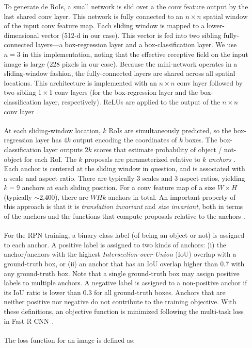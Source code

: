 \documentclass[a4paper]{article}
\begin{document}
To generate de RoIs, a small network is slid over a the conv feature output by the last shared conv layer. This network is fully connected to an $n \times n$ spatial window of the input conv feature map. Each sliding window is mapped to a lower-dimensional vector (512-d in our case). This vector is fed into two sibling fully-connected layers---a box-regression layer and a box-classification layer. We use $n = 3$ in this implementation, noting that the effective receptive field on the input image is large (228 pixels in our case). Because the mini-network operates in a sliding-window fashion, the fully-connected layers are shared across all spatial locations. This architecture is implemented with an $n \times n$ conv layer followed by two sibling $1 \times 1$ conv layers (for the box-regression layer and the box-classification layer, respectively). ReLUs are applied to the output of the $n \times n$ conv layer \cite{fasterrcnn}.
\\
\\
At each sliding-window location, $k$ RoIs are simultaneously predicted, so the box-regression layer has $4k$ output encoding the coordinates of $k$ boxes. The box-classification layer outputs $2k$ scores that estimate probability of object / not-object for each RoI. The $k$ proposals are parameterized relative to $k$ \emph{anchors} \cite{fasterrcnn}. Each anchor is centered at the sliding window in question, and is associated with a scale and aspect ratio. There are typically 3 scales and 3 aspect ratios, yielding $k = 9$ anchors at each sliding position. For a conv feature map of a size $W \times H$ (typically $\sim$2,400), there are $WHk$ anchors in total. An important property of this approach is that it is \emph{translation invariant} and \emph{size invariant}, both in terms of the anchors and the functions that compute proposals relative to the anchors \cite{fasterrcnn}.
\\
\\
For the RPN training, a binary class label (of being an object or not) is assigned to each anchor. A positive label is assigned to two kinds of anchors: (i) the anchor/anchors with the highest \emph{Intersection-over-Union} (IoU) overlap with a ground-truth box, or (ii) an anchor that has an IoU overlap higher than 0.7 with any ground-truth box. Note that a single ground-truth box may assign positive labels to multiple anchors. A negative label is assigned to a non-positive anchor if its IoU ratio is lower than 0.3 for all ground-truth boxes. Anchors that are neither positive nor negative do not contribute to the training objective. With these definitions, an objective function is minimized following the multi-task loss in Fast R-CNN \cite{fastrcnn}.
\\
\\
The loss function for an image is defined as:
\end{document}
